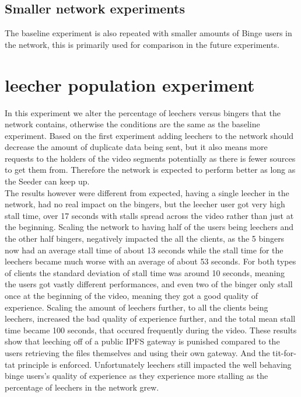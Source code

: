 \subsection{Smaller network experiments}
The baseline experiment is also repeated with smaller amounts of Binge users in the network, this is primarily used for comparison in the future experiments.

\section{leecher population experiment}
In this experiment we alter the percentage of leechers versus bingers that the network contains, otherwise the conditions are the same as the baseline experiment.
Based on the first experiment adding leechers to the network should decrease the amount of duplicate data being sent, but it also means more requests to the holders of the video segments potentially as there is fewer sources to get them from. Therefore the network is expected to perform better as long as the Seeder can keep up.\\
The results however were different from expected, having a single leecher in the network, had no real impact on the bingers, but the leecher user got very high stall time, over 17 seconds with stalls spread across the video rather than just at the beginning. %
Scaling the network to having half of the users being leechers and the other half bingers, negatively impacted the all the clients, as the 5 bingers now had an average stall time of about 13 seconds while the stall time for the leechers became much worse with an average of about 53 seconds. For both types of clients the standard deviation of stall time was around 10 seconds, meaning the users got vastly different performances, and even two of the binger only stall once at the beginning of the video, meaning they got a good quality of experience. %
Scaling the amount of leechers further, to all the clients being leechers, increased the bad quality of experience further, and the total mean stall time became 100 seconds, that occured frequently during the video. %
These results show that leeching off of a public \acs{IPFS} gateway is punished compared to the users retrieving the files themselves and using their own gateway. And the tit-for-tat principle is enforced. Unfortunately leechers still impacted the well behaving binge users's quality of experience as they experience more stalling as the percentage of leechers in the network grew.\\
